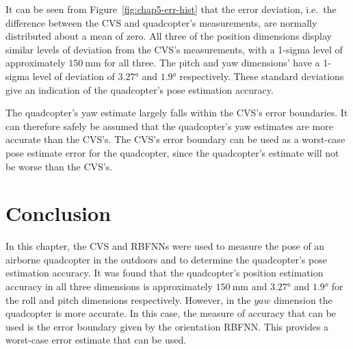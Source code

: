 It can be seen from Figure~\ref{fig:chap5-err-hist} that the error deviation, i.e.\ the difference between the CVS and quadcopter's measurements, are normally distributed about a mean of zero. All three of the position dimensions display similar levels of deviation from the CVS's measurements, with a 1-sigma level of approximately $\SI{150}{\mm}$ for all three. The pitch and yaw dimensions' have a 1-sigma level of deviation of $\ang{3.27}$ and $\ang{1.9}$ respectively. These standard deviations give an indication of the quadcopter's pose estimation accuracy. 

The quadcopter's yaw estimate largely falls within the CVS's error boundaries. It can therefore safely be assumed that the quadcopter's yaw estimates are more accurate than the CVS's. The CVS's error boundary can be used as a worst-case pose estimate error for the quadcopter, since the quadcopter's estimate will not be worse than the CVS's.




\section{Conclusion}

In this chapter, the CVS and RBFNNs were used to measure the pose of an airborne quadcopter in the outdoors and to determine the quadcopter's pose estimation accuracy. It was found that the quadcopter's position estimation accuracy in all three dimensions is approximately $\SI{150}{\mm}$ and $\ang{3.27}$ and $\ang{1.9}$ for the roll and pitch dimensions respectively. However, in the $yaw$ dimension the quadcopter is more accurate. In this case, the measure of accuracy that can be used is the error boundary given by the orientation RBFNN. This provides a worst-case error estimate that can be used. 

